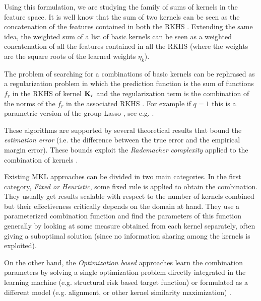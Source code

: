 \documentclass{esannV2}
\newcommand{\KK}{{\bf K}}
\newcommand{\1}{{\bf 1}}
\begin{document}
Using this formulation, we are studying the family of sums of kernels in the feature space. It is well know that the sum of two kernels can be seen as the concatenation of the features contained in both the RKHS \cite{Shawe-Taylor2004}. Extending the same idea, the weighted sum of a list of basic kernels can be seen as a weighted concatenation of all the features contained in all the RKHS (where the weights are the square roots of the learned weights $\eta_k$).

The problem of searching for a combinations of basic kernels can be rephrased as a regularization problem in which the prediction function is the sum of functions $f_r$ in the RKHS of kernel $\KK_r$ and the regularization term is the combination of the norms of the $f_r$ in the associated RKHS \cite{Micchelli2005a}. %
For example if $q=1$ this is a parametric version of the group Lasso \cite{Meier2009}, see e.g. \cite{Maurer2012}.

These algorithms are supported by several theoretical results that bound the \emph{estimation error} (i.e. the difference between the true error and the empirical margin error). These bounds exploit the \emph{Rademacher complexity} applied to the combination of kernels \cite{Maurer2012,Srebro2006,Cortes2009c,Hussain2011,Hussain2011a}. %

Existing MKL approaches can be divided in two main categories. In the first category, \emph{Fixed or Heuristic}, some fixed rule is applied to obtain the combination. They usually get results scalable with respect to the number of kernels combined but their effectiveness critically depends on the domain at hand. They use a parameterized combination function and find the parameters of this function generally by looking at some measure obtained from each kernel separately,  often giving a suboptimal solution (since no information sharing among the kernels is exploited).

On the other hand, the \emph{Optimization based} approaches learn the combination parameters by solving a single optimization problem directly integrated in the learning machine (e.g. structural risk based target function) or formulated as a different model (e.g. alignment, or other kernel similarity maximization) \cite{Rakotomamonjy2008,Bach2004,Varma2009}. %

\end{document}
